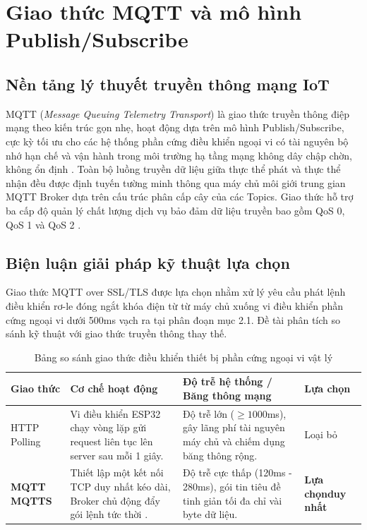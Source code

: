\documentclass[../DoAn.tex]{subfiles}
\begin{document}
\clearpage

\section{Giao thức MQTT và mô hình Publish/Subscribe}
\label{section:3.3}

\subsection{Nền tảng lý thuyết truyền thông mạng IoT}

MQTT (\textit{Message Queuing Telemetry Transport}) là giao thức truyền thông điệp mạng theo kiến trúc gọn nhẹ, hoạt động dựa trên mô hình Publish/Subscribe, cực kỳ tối ưu cho các hệ thống phần cứng điều khiển ngoại vi có tài nguyên bộ nhớ hạn chế và vận hành trong môi trường hạ tầng mạng không dây chập chờn, không ổn định \cite{mqtt5}. Toàn bộ luồng truyền dữ liệu giữa thực thể phát và thực thể nhận đều được định tuyến tường minh thông qua máy chủ môi giới trung gian MQTT Broker dựa trên cấu trúc phân cấp cây của các Topics. Giao thức hỗ trợ ba cấp độ quản lý chất lượng dịch vụ bảo đảm dữ liệu truyền bao gồm QoS 0, QoS 1 và QoS 2 \cite{mqtt5}.

\subsection{Biện luận giải pháp kỹ thuật lựa chọn}

Giao thức MQTT over SSL/TLS được lựa chọn nhằm xử lý yêu cầu phát lệnh điều khiển rơ-le đóng ngắt khóa điện từ từ máy chủ xuống vi điều khiển phần cứng ngoại vi dưới 500ms vạch ra tại phân đoạn mục 2.1. Đề tài phân tích so sánh kỹ thuật với giao thức truyền thông thay thế.

\begin{table}[ht!]
\centering
\small
\renewcommand{\arraystretch}{1.3}
\caption{Bảng so sánh giao thức điều khiển thiết bị phần cứng ngoại vi vật lý}
\label{tab:mqtt_comparison}
\begin{tabular}{|>{\raggedright\arraybackslash}p{2.3cm}|>{\raggedright\arraybackslash}p{4.5cm}|>{\raggedright\arraybackslash}p{5.5cm}|>{\centering\arraybackslash}p{1.7cm}|}
\hline
\textbf{Giao thức} & \textbf{Cơ chế hoạt động} & \textbf{Độ trễ hệ thống / Băng thông mạng} & \textbf{Lựa chọn} \\ \hline
HTTP Polling & Vi điều khiển ESP32 chạy vòng lặp gửi request liên tục lên server sau mỗi 1 giây. & Độ trễ lớn ($\ge 1000$ms), gây lãng phí tài nguyên máy chủ và chiếm dụng băng thông rộng. & Loại bỏ \\ \hline
\textbf{MQTT MQTTS} & Thiết lập một kết nối TCP duy nhất kéo dài, Broker chủ động đẩy gói lệnh tức thời \cite{mqtt5}. & Độ trễ cực thấp (120ms - 280ms), gói tin tiêu đề tinh giản tối đa chỉ vài byte dữ liệu. & \textbf{Lựa chọn\newline duy nhất} \\ \hline
\end{tabular}
\end{table}
\end{document}

